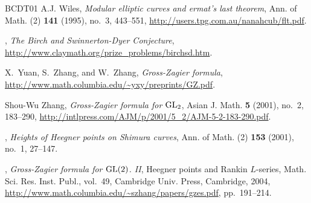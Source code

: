 \documentclass[preprint,12pt]{elsarticle}
\theoremstyle{plain}
\theoremstyle{definition}
\begin{document}
\begin{thebibliography}{BCDT01}
A.\thinspace{}J. Wiles, \emph{Modular elliptic curves and ermat's
  last theorem}, Ann. of Math. (2) \textbf{141} (1995), no.~3, 443--551,
  \url{http://users.tpg.com.au/nanahcub/flt.pdf}.

\bysame, \emph{The {B}irch and {S}winnerton-{D}yer {C}onjecture},
  \url{http://www.claymath.org/prize_problems/birchsd.htm}.

X.~Yuan, S.~Zhang, and W.~Zhang, \emph{Gross-{Z}agier formula},
  \url{http://www.math.columbia.edu/~yxy/preprints/GZ.pdf}.

Shou-Wu Zhang, \emph{Gross-{Z}agier formula for {${\rm GL}\sb 2$}}, Asian J.
  Math. \textbf{5} (2001), no.~2, 183--290,
  \url{http://intlpress.com/AJM/p/2001/5_2/AJM-5-2-183-290.pdf}. 

\bysame, \emph{Heights of {H}eegner points on {S}himura curves}, Ann. of Math.
  (2) \textbf{153} (2001), no.~1, 27--147. 

\bysame, \emph{Gross-{Z}agier formula for {$\rm GL(2)$}. {II}}, Heegner points
  and Rankin {$L$}-series, Math. Sci. Res. Inst. Publ., vol.~49, Cambridge
  Univ. Press, Cambridge, 2004,
  \url{http://www.math.columbia.edu/~szhang/papers/gzes.pdf}, pp.~191--214.

\end{thebibliography}
\end{document}
